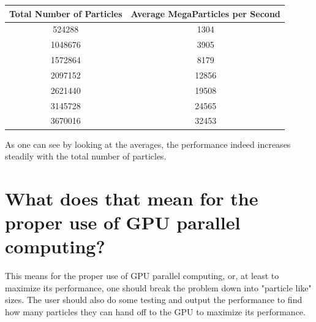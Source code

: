 \documentclass[onecolumn,draftclsnofoot, 10pt, compsoc]{IEEEtran}
\begin{document}
	\begin{tabular}{c|c}
		\hline 
		\textbf{Total Number of Particles} & \textbf{Average MegaParticles per Second} \\ \hline	
		524288 & 1304 \\ \hline
		1048676 & 3905 \\ \hline
		1572864& 8179 \\ \hline
		2097152& 12856 \\ \hline
		2621440& 19508 \\ \hline
		3145728& 24565 \\ \hline
		3670016& 32453 \\ \hline
	\end{tabular}

	As one can see by looking at the averages, the performance indeed increases steadily with the total number of particles.









\section{What does that mean for the proper use of GPU parallel computing?}
	This means for the proper use of GPU parallel computing, or, at least to maximize its performance, one should break the problem down into "particle like" sizes. The user should also do some testing and output the performance to find how many particles they can hand off to the GPU to maximize its performance. 
\end{document}
